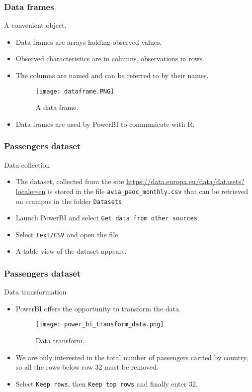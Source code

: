 \begin{frame}
    \frametitle{Data frames}
\begin{block}{A convenient object.}
    \begin{itemize}
        \item<+-> Data frames are arrays holding observed values.
        \item<+-> Observed characteristics are in columns, observations in rows.
        \item<+-> The columns are named and can be referred to by their names.
        \begin{figure}[htbp]
            \centering
           \texttt{[image: dataframe.PNG]}
            \caption{A data frame.}
            \label{fig:data_frame}
           \end{figure}
        \item<+-> Data frames are used by PowerBI to communicate with R.
    \end{itemize}
\end{block}
\end{frame}
\begin{frame}
    \frametitle{Passengers dataset}
    \begin{block}{Data collection}
        \begin{itemize}
            \item<+-> The dataset, collected from the site \url{https://data.europa.eu/data/datasets?locale=en}
            is stored in the file \texttt{avia\_paoc\_monthly.csv} that can be retrieved on ecampus in the folder \texttt{Datasets}.
            \item<+-> Launch PowerBI and select \texttt{Get data from other sources}.
            \item<+-> Select \texttt{Text/CSV} and open the file.
            \item<+-> A table view of the dataset appears.
        \end{itemize}
    \end{block}
\end{frame}
\begin{frame}
    \frametitle{Passengers dataset}
    \begin{block}{Data transformation}
        \begin{itemize}
            \item<+-> PowerBI offers the opportunity to transform the data.
            \begin{figure}[htbp]
                \centering
                \texttt{[image: power\_bi\_transform\_data.png]}
                \caption{Data transform.}
                \label{fig:data_transform}
            \end{figure}
            \item<+-> We are only interested in the total number of passengers carried by country, so all the rows
            below row 32 must be removed.
            \item<+-> Select \texttt{Keep rows}, then \texttt{Keep top rows} and finally enter 32. 
        \end{itemize}
    \end{block}
\end{frame}
